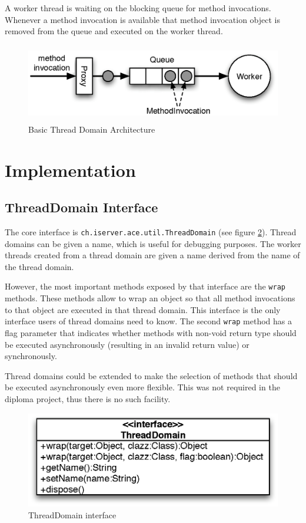 A worker thread is waiting on the blocking queue for method invocations.
Whenever a method invocation is available that method invocation object
is removed from the queue and executed on the worker thread. 

\begin{figure}[H]
 \centering
 \includegraphics[width=13cm,height=3.4cm]{../images/finalreport/threaddomain_basic.eps}
 \caption{Basic Thread Domain Architecture}
 \label{fig:threaddomain_basic}
\end{figure}



\section{Implementation}

\subsection{ThreadDomain Interface}
The core interface is \texttt{ch.iserver.ace.util.ThreadDomain} 
(see figure \ref{fig:threaddomain_interface}). Thread domains can be given
a name, which is useful for debugging purposes. The worker threads created
from a thread domain are given a name derived from the name of the thread
domain.

However, the most important methods exposed by that interface are the 
\texttt{wrap} methods. These methods allow to wrap an object so that all 
method invocations to that object are executed in that thread domain. This 
interface is the only interface users of thread domains need to know. The
second \texttt{wrap} method has a flag parameter that indicates whether
methods with non-void return type should be executed asynchronously (resulting
in an invalid return value) or synchronously.

Thread domains could be extended to make the selection of methods that should
be executed asynchronously even more flexible. This was not required in
the diploma project, thus there is no such facility.

\begin{figure}[H]
 \centering
 \includegraphics[width=11.4cm,height=4.2cm]{../images/finalreport/threaddomain_uml.eps}
 \caption{ThreadDomain interface}
 \label{fig:threaddomain_interface}
\end{figure}

